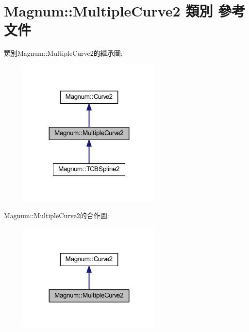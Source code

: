 \hypertarget{class_magnum_1_1_multiple_curve2}{}\section{Magnum\+:\+:Multiple\+Curve2 類別 參考文件}
\label{class_magnum_1_1_multiple_curve2}


類別\+Magnum\+:\+:Multiple\+Curve2的繼承圖\+:\nopagebreak
\begin{figure}[H]
\begin{center}
\leavevmode
\includegraphics[width=203pt]{class_magnum_1_1_multiple_curve2__inherit__graph}
\end{center}
\end{figure}


Magnum\+:\+:Multiple\+Curve2的合作圖\+:\nopagebreak
\begin{figure}[H]
\begin{center}
\leavevmode
\includegraphics[width=203pt]{class_magnum_1_1_multiple_curve2__coll__graph}
\end{center}
\end{figure}
